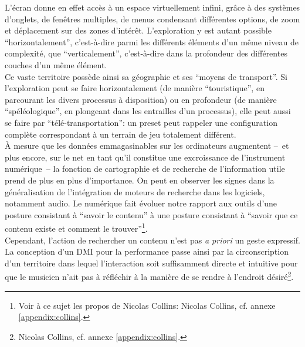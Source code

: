 \noindent L'écran donne en effet accès à un espace virtuellement infini, grâce à des systèmes d'onglets, de fenêtres multiples, de menus condensant différentes options, de zoom et déplacement sur des zones d'intérêt. L'exploration y est autant possible ``horizontalement'', c'est-à-dire parmi les différents éléments d'un même niveau de complexité, que ``verticalement'', c'est-à-dire dans la profondeur des différentes couches d'un même élément.\\
\indent Ce vaste territoire possède ainsi sa géographie et ses ``moyens de transport''. Si l'exploration peut se faire horizontalement (de manière ``touristique'', en parcourant les divers processus à disposition) ou en profondeur (de manière ``spéléologique'', en plongeant dans les entrailles d'un processus), elle peut aussi se faire par ``télé-transportation'': un preset peut rappeler une configuration complète correspondant à un terrain de jeu totalement différent.\\
\indent À mesure que les données emmagasinables sur les ordinateurs augmentent --~et plus encore, sur le net en tant qu'il constitue une excroissance de l'instrument numérique~-- la fonction de cartographie et de recherche de l'information utile prend de plus en plus d'importance. On peut en observer les signes dans la généralisation de l'intégration de moteurs de recherche dans les logiciels, notamment audio. Le numérique fait évoluer notre rapport aux outils d'une posture consistant à ``savoir le contenu'' à une posture consistant à ``savoir que ce contenu existe et comment le trouver''\footnote{Voir à ce sujet les propos de Nicolas Collins:  Nicolas Collins, cf. annexe \ref{appendix:collins}.}.\\
\indent Cependant, l'action de rechercher un contenu n'est pas \textit{a priori} un geste expressif. La conception d'un \gls{DMI} pour la performance passe ainsi par la circonscription d'un territoire dans lequel l'interaction soit suffisamment directe et intuitive pour que le musicien n'ait pas à réfléchir à la manière de se rendre à l'endroit désiré\footnote{ Nicolas Collins, cf. annexe \ref{appendix:collins}.}.


